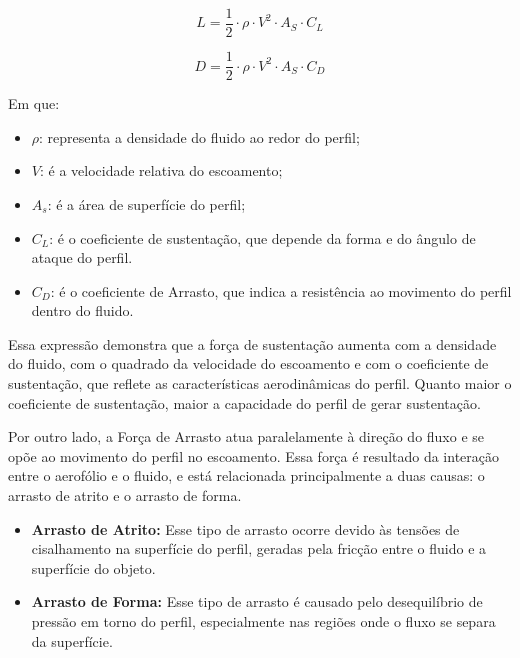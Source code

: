         \begin{equation}
        L = \frac{1}{2} \cdot \rho \cdot V^2 \cdot A_S \cdot C_L 
        \label{eq:Força de Sustentação L}
        \end{equation}

        \begin{equation}
        D = \frac{1}{2} \cdot \rho \cdot V^2 \cdot A_S \cdot C_D
        \label{eq:Eq Força de Arrasto}
        \end{equation}
        
        Em que:
        \begin{itemize}  
            \item $\rho$: representa a densidade do fluido ao redor do perfil;  
            \item $V$: é a velocidade relativa do escoamento;  
            \item $A_s$: é a área de superfície do perfil;  
            \item $C_L$: é o coeficiente de sustentação, que depende da forma e do ângulo de ataque do perfil.
            \item $C_D$: é o coeficiente de Arrasto, que indica a resistência ao movimento do perfil dentro do fluido.
        \end{itemize}   

        \par Essa expressão demonstra que a força de sustentação aumenta com a densidade do fluido, com o quadrado da velocidade do escoamento e com o coeficiente de sustentação, que reflete as características aerodinâmicas do perfil. Quanto maior o coeficiente de sustentação, maior a capacidade do perfil de gerar sustentação.

        \par Por outro lado, a Força de Arrasto atua paralelamente à direção do fluxo e se opõe ao movimento do perfil no escoamento. Essa força é resultado da interação entre o aerofólio e o fluido, e está relacionada principalmente a duas causas: o arrasto de atrito e o arrasto de forma.

        \begin{itemize}  
            \item \textbf{Arrasto de Atrito:} Esse tipo de arrasto ocorre devido às tensões de cisalhamento na superfície do perfil, geradas pela fricção entre o fluido e a superfície do objeto.  
    
            \item \textbf{Arrasto de Forma:} Esse tipo de arrasto é causado pelo desequilíbrio de pressão em torno do perfil, especialmente nas regiões onde o fluxo se separa da superfície.  
        \end{itemize}  




